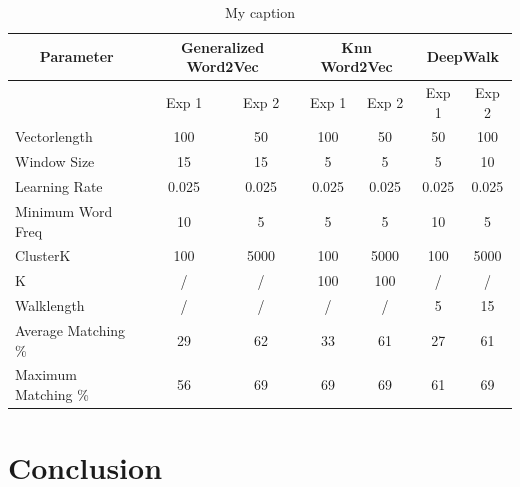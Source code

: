 \begin{table}[!htb]
\centering
\begin{tabular}{ccccccc}
\hline
Parameter                                   & \multicolumn{2}{c}{Generalized Word2Vec}         & \multicolumn{2}{c}{Knn Word2Vec}                 & \multicolumn{2}{c}{DeepWalk} \\ \hline
\multicolumn{1}{l|}{}                       & Exp 1 & \multicolumn{1}{c|}{Exp 2} & Exp 1 & \multicolumn{1}{c|}{Exp 2} & Exp 1  & Exp 2 \\ \hline
\multicolumn{1}{l|}{Vectorlength}           & 100          & \multicolumn{1}{c|}{50}           & 100          & \multicolumn{1}{c|}{50}           & 50            & 100          \\
\multicolumn{1}{l|}{Window Size}            & 15           & \multicolumn{1}{c|}{15}           & 5            & \multicolumn{1}{c|}{5}            & 5             & 10           \\
\multicolumn{1}{l|}{Learning Rate}          & 0.025        & \multicolumn{1}{c|}{0.025}        & 0.025        & \multicolumn{1}{c|}{0.025}        & 0.025         & 0.025        \\
\multicolumn{1}{l|}{Minimum Word Freq} & 10           & \multicolumn{1}{c|}{5}            & 5            & \multicolumn{1}{c|}{5}            & 10            & 5            \\
\multicolumn{1}{l|}{ClusterK}               & 100          & \multicolumn{1}{c|}{5000}         & 100          & \multicolumn{1}{c|}{5000}         & 100           & 5000         \\
\multicolumn{1}{l|}{K}                      & /            & \multicolumn{1}{c|}{/}            & 100          & \multicolumn{1}{c|}{100}          & /             & /            \\ \hline
\multicolumn{1}{l|}{Walklength}             & /            & \multicolumn{1}{c|}{/}            & /            & \multicolumn{1}{c|}{/}            & 5             & 15           \\
\multicolumn{1}{l|}{Average Matching \%}    & 29           & \multicolumn{1}{c|}{62}           & 33           & \multicolumn{1}{c|}{61}           & 27            & 61           \\
\multicolumn{1}{l|}{Maximum Matching \%}    & 56           & \multicolumn{1}{c|}{69}           & 69           & \multicolumn{1}{c|}{69}           & 61            & 69          
\end{tabular}

\caption{My caption}
\label{my-label}
\end{table}

\section{Conclusion}





